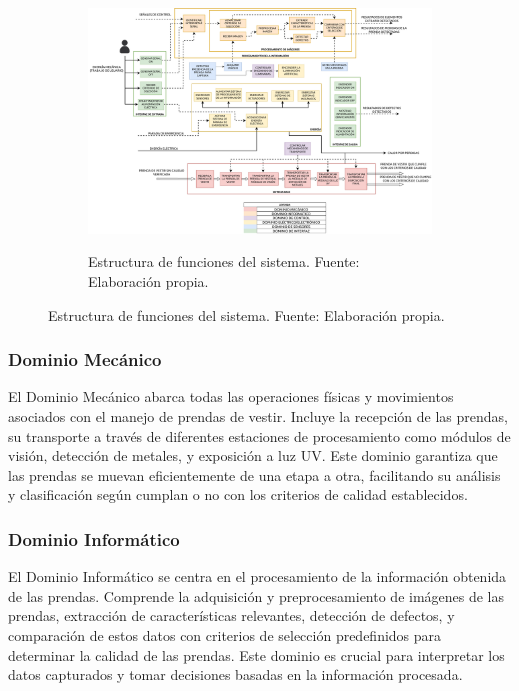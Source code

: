 \begin{figure}
	\begin{figure}[H]
		\centering
		\includegraphics[width=\textwidth]{img/ESTRUCTURA_DE_FUNCIONES.drawio.pdf}
		\label{fig:ESTRUCTURA_DE_FUNCIONES}
		\caption[Estructura de funciones del sistema.]{Estructura de funciones del sistema. Fuente: Elaboración propia.}
	\end{figure}
\end{figure}

\subsubsection{Dominio Mecánico}

El Dominio Mecánico abarca todas las operaciones físicas y movimientos asociados con el manejo de prendas de vestir. Incluye la recepción de las prendas, su transporte a través de diferentes estaciones de procesamiento como módulos de visión, detección de metales, y exposición a luz UV. Este dominio garantiza que las prendas se muevan eficientemente de una etapa a otra, facilitando su análisis y clasificación según cumplan o no con los criterios de calidad establecidos.

\subsubsection{Dominio Informático}

El Dominio Informático se centra en el procesamiento de la información obtenida de las prendas. Comprende la adquisición y preprocesamiento de imágenes de las prendas, extracción de características relevantes, detección de defectos, y comparación de estos datos con criterios de selección predefinidos para determinar la calidad de las prendas. Este dominio es crucial para interpretar los datos capturados y tomar decisiones basadas en la información procesada.

